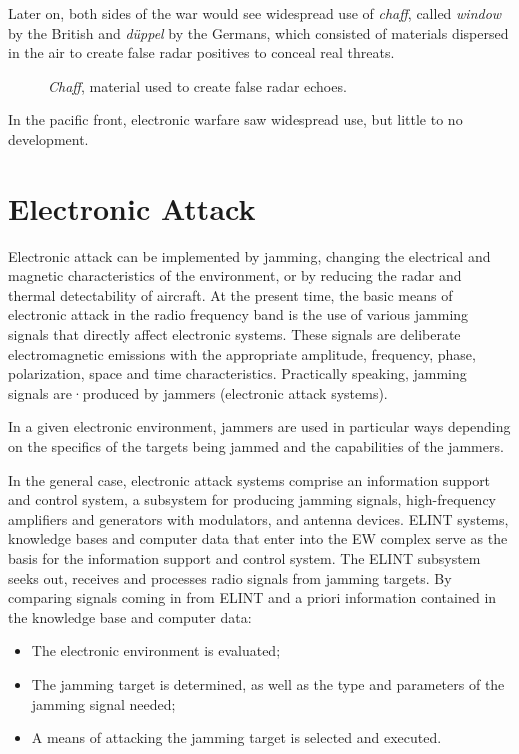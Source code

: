 \documentclass[palatino,english,purist]{ist-report}
\begin{document}
Later on, both sides of the war would see widespread use of \textit{chaff}, called \textit{window} by the British and \textit{düppel} by the Germans, which consisted of materials dispersed in the air to create false radar positives to conceal real threats.
\begin{figure}[ht]
    \centering
    \caption{\textit{Chaff}, material used to create false radar echoes.}
    \label{fig:chaff}
\end{figure}

In the pacific front, electronic warfare saw widespread use, but little to no development.

\part{Electronic Attack}

Electronic attack can be implemented by jamming, changing the electrical and magnetic characteristics of the environment, or by reducing the radar and thermal detectability of aircraft.
At the present time, the basic means of electronic attack in the radio
frequency band is the use of various jamming signals that directly affect electronic systems. These signals are deliberate electromagnetic emissions with the appropriate amplitude, frequency, phase, polarization, space and time characteristics. Practically speaking, jamming signals are·produced by jammers (electronic attack systems). 

In a given electronic environment, jammers are used in particular ways
depending on the specifics of the targets being jammed and the capabilities of the jammers. 

In the general case, electronic attack systems comprise an information
support and control system, a subsystem for producing jamming signals,
high-frequency amplifiers and generators with modulators, and antenna
devices. ELINT systems, knowledge bases and computer data that enter into the EW complex serve as the basis for the information support and control system. The ELINT subsystem seeks out, receives and processes radio signals from jamming targets. By comparing signals coming in from ELINT and a priori information contained in the knowledge base and computer data: 

\begin{itemize}
    \item The electronic environment is evaluated; 
    \item The jamming target is determined, as well as the type and
parameters of the jamming signal needed; 
    \item A means of attacking the jamming target is selected and executed. 
\end{itemize}
\end{document}
